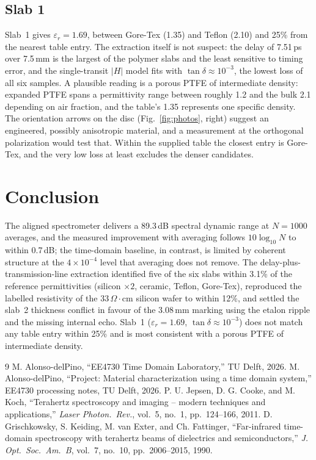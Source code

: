 \documentclass[conference]{IEEEtran}
\begin{document}
\subsection{Slab 1}
\label{sec:slab1}
Slab~1 gives $\varepsilon_r = 1.69$, between Gore-Tex (1.35) and Teflon (2.10) and 25\% from the nearest table entry. The extraction itself is not suspect: the delay of 7.51\,ps over 7.5\,mm is the largest of the polymer slabs and the least sensitive to timing error, and the single-transit $|H|$ model fits with $\tan\delta \approx 10^{-3}$, the lowest loss of all six samples. A plausible reading is a porous PTFE of intermediate density: expanded PTFE spans a permittivity range between roughly 1.2 and the bulk 2.1 depending on air fraction, and the table's 1.35 represents one specific density. The orientation arrows on the disc (Fig.~\ref{fig:photos}, right) suggest an engineered, possibly anisotropic material, and a measurement at the orthogonal polarization would test that. Within the supplied table the closest entry is Gore-Tex, and the very low loss at least excludes the denser candidates.

\section{Conclusion}
The aligned spectrometer delivers a 89.3\,dB spectral dynamic range at $N=1000$ averages, and the measured improvement with averaging follows $10\log_{10}N$ to within 0.7\,dB; the time-domain baseline, in contrast, is limited by coherent structure at the $4\times10^{-4}$ level that averaging does not remove. The delay-plus-transmission-line extraction identified five of the six slabs within 3.1\% of the reference permittivities (silicon $\times 2$, ceramic, Teflon, Gore-Tex), reproduced the labelled resistivity of the 33\,$\Omega\cdot$cm silicon wafer to within 12\%, and settled the slab~2 thickness conflict in favour of the 3.08\,mm marking using the etalon ripple and the missing internal echo. Slab~1 ($\varepsilon_r = 1.69$, $\tan\delta \approx 10^{-3}$) does not match any table entry within 25\% and is most consistent with a porous PTFE of intermediate density.

\begin{thebibliography}{9}
 M. Alonso-delPino, ``EE4730 Time Domain Laboratory,'' TU Delft, 2026.
 M. Alonso-delPino, ``Project: Material characterization using a time domain system,'' EE4730 processing notes, TU Delft, 2026.
 P. U. Jepsen, D. G. Cooke, and M. Koch, ``Terahertz spectroscopy and imaging -- modern techniques and applications,'' \emph{Laser Photon.\ Rev.}, vol.~5, no.~1, pp.~124--166, 2011.
 D. Grischkowsky, S. Keiding, M. van Exter, and Ch. Fattinger, ``Far-infrared time-domain spectroscopy with terahertz beams of dielectrics and semiconductors,'' \emph{J. Opt.\ Soc.\ Am.\ B}, vol.~7, no.~10, pp.~2006--2015, 1990.
\end{thebibliography}
\end{document}
